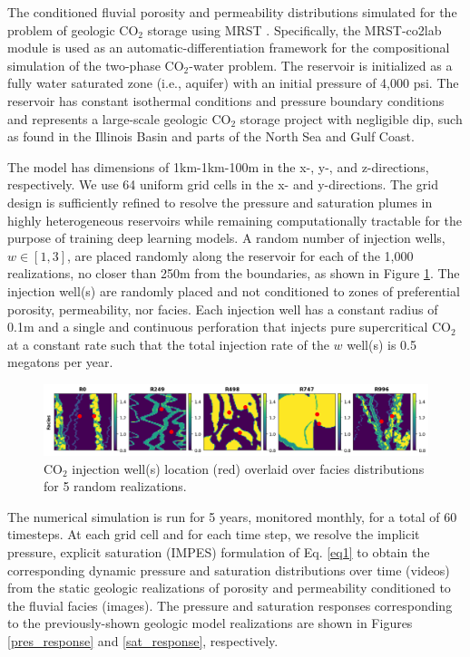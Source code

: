 \documentclass[10pt, twoside]{article}
\begin{document}
The conditioned fluvial porosity and permeability distributions simulated for the problem of geologic CO$_2$ storage using MRST \cite{MRST2019}. Specifically, the MRST-co2lab module is used as an automatic-differentiation framework for the compositional simulation of the two-phase CO$_2$-water problem. The reservoir is initialized as a fully water saturated zone (i.e., aquifer) with an initial pressure of 4,000 psi. The reservoir has constant isothermal conditions and pressure boundary conditions and represents a large-scale geologic CO$_2$ storage project with negligible dip, such as found in the Illinois Basin and parts of the North Sea and Gulf Coast. 

The model has dimensions of 1km-1km-100m in the x-, y-, and z-directions, respectively. We use 64 uniform grid cells in the x- and y-directions. The grid design is sufficiently refined to resolve the pressure and saturation plumes in highly heterogeneous reservoirs while remaining computationally tractable for the purpose of training deep learning models. A random number of injection wells, $w \in [1,3]$, are placed randomly along the reservoir for each of the 1,000 realizations, no closer than 250m from the boundaries, as shown in Figure \ref{wells_dist}. The injection well(s) are randomly placed and not conditioned to zones of preferential porosity, permeability, nor facies. Each injection well has a constant radius of 0.1m and a single and continuous perforation that injects pure supercritical CO$_2$ at a constant rate such that the total injection rate of the $w$ well(s) is 0.5 megatons per year.

\begin{figure}[t]
    \centering
    \includegraphics[width=16cm]{figures/wells_dist.png}
    \caption{CO$_2$ injection well(s) location (red) overlaid over facies distributions for 5 random realizations.}
    \label{wells_dist}
\end{figure}

The numerical simulation is run for 5 years, monitored monthly, for a total of 60 timesteps. At each grid cell and for each time step, we resolve the implicit pressure, explicit saturation (IMPES) formulation of Eq. \eqref{eq1} to obtain the corresponding dynamic pressure and saturation distributions over time (videos) from the static geologic realizations of porosity and permeability conditioned to the fluvial facies (images). The pressure and saturation responses corresponding to the previously-shown geologic model realizations are shown in Figures \ref{pres_response} and \ref{sat_response}, respectively.
\end{document}
